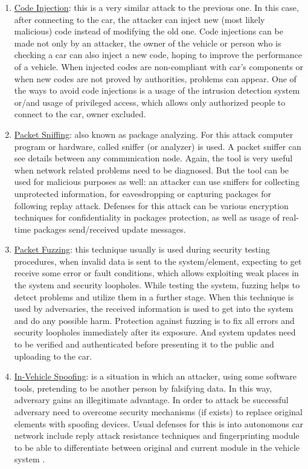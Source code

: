 \begin{itemize}
\begin{enumerate}
\begin{enumerate}
\begin{enumerate}
				\item \underline{Code Injection}: this is a very similar attack to the previous one. In this case, after connecting to the car, the attacker can inject new (most likely malicious) code instead of modifying the old one. Code injections can be made not only by an attacker, the owner of the vehicle or person who is checking a car can also inject a new code, hoping to improve the performance of a vehicle. When injected codes are non-compliant with car's components or when new codes are not proved by authorities, problems can appear. One of the ways to avoid code injections is a usage of the intrusion detection system or/and usage of privileged access, which allows only authorized people to connect to the car, owner excluded.
				\item \underline{Packet Sniffing}: also known as package analyzing. For this attack computer program or hardware, called sniffer (or analyzer) is used. A packet sniffer can see details between any communication node.  Again, the tool is very useful when network related problems need to be diagnosed. But the tool can be used for malicious purposes as well: an attacker can use sniffers for collecting unprotected information, for eavesdropping or capturing packages for following replay attack. Defenses for this attack can be various encryption techniques for confidentiality in packages protection, as well as usage of real-time packages send/received update messages.
				\item \underline{Packet Fuzzing}: this technique usually is used during security testing procedures, when invalid data is sent to the system/element, expecting to get receive some error or fault conditions, which allows exploiting weak places in the system and security loopholes. While testing the system, fuzzing helps to detect problems and utilize them in a further stage. When this technique is used by adversaries, the received information is used to get into the system and do any possible harm. Protection against fuzzing is to fix all errors and security loopholes immediately after its exposure. And system updates need to be verified and authenticated before presenting it to the public and uploading to the car.
				\item \underline{In-Vehicle Spoofing}: is a situation in which an attacker, using some software tools, pretending to be another person by falsifying data. In this way, adversary gains an illegitimate advantage. In order to attack be successful adversary need to overcome security mechanisms (if exists) to replace original elements with spoofing devices. Usual defenses for this is into autonomous car network include reply attack resistance techniques and fingerprinting module to be able to differentiate between original and current module in the vehicle system \cite{attacTax1}.

\end{enumerate}
\end{enumerate}
\end{enumerate}
\end{itemize}
